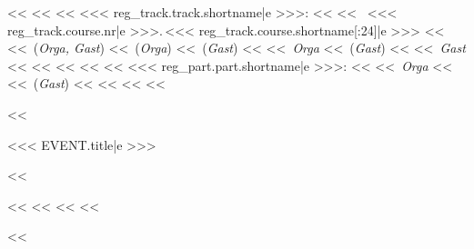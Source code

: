             <<%
                \fontsize{30}{40}\selectfont
                <<%
                    <<%
                        <<< reg_track.track.shortname|e >>>:
                    <<%
                    <<%
                        ~<<< reg_track.course.nr|e >>>.\,<<< reg_track.course.shortname[:24]|e >>>
                        <<%
                        <<%
                            \,(\textit{Orga, Gast})
                        <<%
                            \,(\textit{Orga})
                        <<%
                            \,(\textit{Gast})
                        <<%
                    <<%
                        \,\textit{Orga}
                        <<%
                            \,(\textit{Gast})
                        <<%
                    <<%
                        \,\textit{Gast}
                    <<%
                    <<%
                <<%
                    <<%
                    <<%
                        <<< reg_part.part.shortname|e >>>:
                    <<%
                        <<%
                            \,\textit{Orga}
                        <<%
                        <<%
                            \,(\textit{Gast})
                        <<%
                    <<%
                <<%
            <<%

            <<%
                \begin{flushright}
                    \fontsize{25}{30}\selectfont
                    <<< EVENT.title|e >>>
                \end{flushright}
            <<%

            <<%
                \clearpage
            <<%
        <<%
    <<%

<<%

